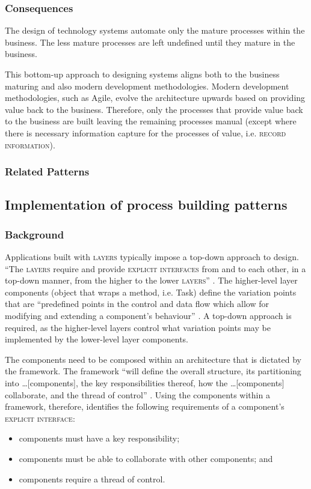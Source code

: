 \documentclass[prodmode]{style/acmlarge}
\begin{document}
\subsubsection*{Consequences} The design of technology systems automate only the
mature processes within the business.  The less mature processes are left
undefined until they mature in the business.

This bottom-up approach to designing systems aligns both to the business
maturing and also modern development methodologies.  Modern development
methodologies, such as Agile, evolve the architecture upwards based on providing
value back to the business.  Therefore, only the processes that provide value
back to the business are built leaving the remaining processes manual (except
where there is necessary information capture for the processes of value, i.e.
\textsc{record information}).

\subsubsection*{Related Patterns}



\subsection{Implementation of process building patterns}

\subsubsection*{Background}

Applications built with \textsc{layers} typically impose a top-down approach to
design.  ``The \textsc{layers} require and provide \textsc{explicit interfaces}
from and to each other, in a top-down manner, from the higher to the lower
\textsc{layers}'' \cite[p. 11]{ioc}.  The higher-level layer components (object
that wraps a method, i.e. Task) define the variation points that are
``predefined points in the control and data flow which allow for modifying and
extending a component's behaviour'' \cite[p. 5]{ioc}.  A top-down approach is
required, as the higher-level layers control what variation points may be
implemented by the lower-level layer components.

The components need to be composed within an architecture that is dictated by
the framework.  The framework ``will define the overall structure, its
partitioning into \ldots [components], the key responsibilities thereof, how the
\ldots [components] collaborate, and the thread of control'' \cite[p.26]{gof}.
Using the components within a framework, therefore, identifies the following
requirements of a component's \textsc{explicit interface}:
\begin{itemize}
  \item components must have a key responsibility;
  \item components must be able to collaborate with other components; and
  \item components require a thread of control.
\end{itemize}
\end{document}
